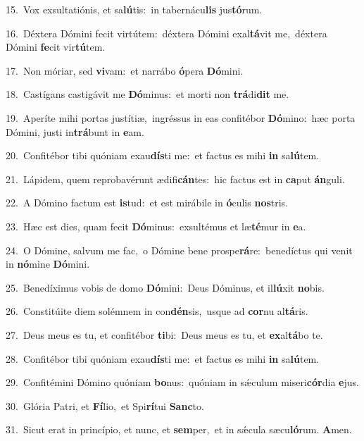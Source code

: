 {\numbfont\textcolor{\numbcolor}{15.}}~Vox exsultatiónis, et sa\-\textbf{lú}\-tis:~\star in tabernácu\textbf{lis} jus\-\textbf{tó}\-rum.\par
{\numbfont\textcolor{\numbcolor}{16.}}~Déxtera Dómini fecit virtútem:~\dagger déxtera Dómini exal\-\textbf{tá}\-vit me,~\star déxtera Dómini \textbf{fe}\-cit vir\-\textbf{tú}\-tem.\par
{\numbfont\textcolor{\numbcolor}{17.}}~Non móriar, sed \textbf{vi}\-vam:~\star et narrábo \textbf{ó}\-pera \textbf{Dó}\-mini.\par
{\numbfont\textcolor{\numbcolor}{18.}}~Castígans castigávit me \textbf{Dó}\-minus:~\star et morti non \textbf{trá}\-di\textbf{dit} me.\par
{\numbfont\textcolor{\numbcolor}{19.}}~Aperíte mihi portas justítiæ,~\dagger ingréssus in eas confitébor \textbf{Dó}\-mino:~\star hæc porta Dómini, justi in\-\textbf{trá}\-bunt in \textbf{e}\-am.\par
{\numbfont\textcolor{\numbcolor}{20.}}~Confitébor tibi quóniam exau\-\textbf{dís}\-ti me:~\star et factus es mihi \textbf{in} sa\-\textbf{lú}\-tem.\par
{\numbfont\textcolor{\numbcolor}{21.}}~Lápidem, quem reprobavérunt ædifi\-\textbf{cán}\-tes:~\star hic factus est in \textbf{ca}\-put \textbf{án}\-guli.\par
{\numbfont\textcolor{\numbcolor}{22.}}~A Dómino factum est \textbf{is}\-tud:~\star et est mirábile in \textbf{ó}\-culis \textbf{nos}\-tris.\par
{\numbfont\textcolor{\numbcolor}{23.}}~Hæc est dies, quam fecit \textbf{Dó}\-minus:~\star exsultémus et læ\-\textbf{té}\-mur in \textbf{e}\-a.\par
{\numbfont\textcolor{\numbcolor}{24.}}~O Dómine, salvum me fac,~\dagger o Dómine bene prospe\-\textbf{rá}\-re:~\star benedíctus qui venit in \textbf{nó}\-mine \textbf{Dó}\-mini.\par
{\numbfont\textcolor{\numbcolor}{25.}}~Benedíximus vobis de domo \textbf{Dó}\-mini:~\star Deus Dóminus, et il\-\textbf{lú}\-xit \textbf{no}\-bis.\par
{\numbfont\textcolor{\numbcolor}{26.}}~Constitúite diem solémnem in con\-\textbf{dén}\-sis,~\star usque ad \textbf{cor}\-nu al\-\textbf{tá}\-ris.\par
{\numbfont\textcolor{\numbcolor}{27.}}~Deus meus es tu, et confitébor \textbf{ti}\-bi:~\star Deus meus es tu, et \textbf{ex}\-al\-\textbf{tá}\-bo te.\par
{\numbfont\textcolor{\numbcolor}{28.}}~Confitébor tibi quóniam exau\-\textbf{dís}\-ti me:~\star et factus es mihi \textbf{in} sa\-\textbf{lú}\-tem.\par
{\numbfont\textcolor{\numbcolor}{29.}}~Confitémini Dómino quóniam \textbf{bo}\-nus:~\star quóniam in sǽculum miseri\-\textbf{cór}\-dia \textbf{e}\-jus.\par
{\numbfont\textcolor{\numbcolor}{30.}}~Glória Patri, et \textbf{Fí}\-lio,~\star et Spi\-\textbf{rí}\-tui \textbf{Sanc}\-to.\par
{\numbfont\textcolor{\numbcolor}{31.}}~Sicut erat in princípio, et nunc, et \textbf{sem}\-per,~\star et in sǽcula sæcu\-\textbf{ló}\-rum. \textbf{A}\-men.\par

